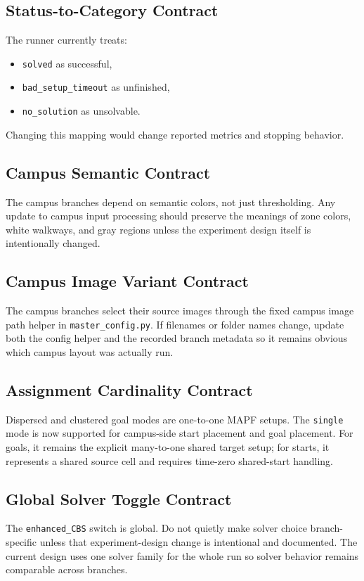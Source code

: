 \documentclass[11pt]{article}
\begin{document}
\subsection{Status-to-Category Contract}
The runner currently treats:
\begin{itemize}[leftmargin=2em]
    \item \texttt{solved} as successful,
    \item \texttt{bad\_setup\_timeout} as unfinished,
    \item \texttt{no\_solution} as unsolvable.
\end{itemize}
Changing this mapping would change reported metrics and stopping behavior.

\subsection{Campus Semantic Contract}
The campus branches depend on semantic colors, not just thresholding. Any update to campus input processing should preserve the meanings of zone colors, white walkways, and gray regions unless the experiment design itself is intentionally changed.

\subsection{Campus Image Variant Contract}
The campus branches select their source images through the fixed campus image path helper in \texttt{master\_config.py}. If filenames or folder names change, update both the config helper and the recorded branch metadata so it remains obvious which campus layout was actually run.

\subsection{Assignment Cardinality Contract}
Dispersed and clustered goal modes are one-to-one MAPF setups. The \texttt{single} mode is now supported for campus-side start placement and goal placement. For goals, it remains the explicit many-to-one shared target setup; for starts, it represents a shared source cell and requires time-zero shared-start handling.

\subsection{Global Solver Toggle Contract}
The \texttt{enhanced\_CBS} switch is global. Do not quietly make solver choice branch-specific unless that experiment-design change is intentional and documented. The current design uses one solver family for the whole run so solver behavior remains comparable across branches.
\end{document}
